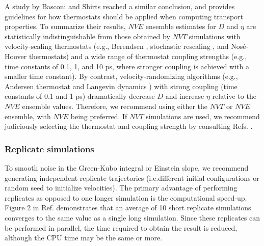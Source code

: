 \documentclass[9pt,bestpractices]{livecoms}
\providecommand{\DIFadd}[1]{{\protect\color{blue}\uwave{#1}}} %
\providecommand{\DIFaddbegin}{} %
\providecommand{\DIFaddend}{} %
\begin{document}
\DIFaddend A study by Basconi and Shirts \cite{Shirts2013} reached a similar conclusion, and provides guidelines for how thermostats should be applied when computing transport properties. To summarize their results, $NVE$ ensemble estimates for $D$ and $\eta$ are statistically indistinguishable from those obtained by $NVT$ simulations with velocity-scaling thermostats (e.g., Berendsen \cite{Berendsen1984}, stochastic rescaling \cite{Bussi2007}, and Nos{\'e}-Hoover \cite{Nose1984} thermostats) and a wide range of thermostat coupling strengths (e.g., time constants of 0.1, 1, and 10 ps, where stronger coupling is achieved with a smaller time constant). By contrast, velocity-randomizing algorithms (e.g., Andersen thermostat \cite{Andersen1980} and Langevin dynamics \cite{Hess2008}) with strong coupling (time constants of 0.1 and 1 ps) dramatically decrease $D$ and increase $\eta$ relative to the $NVE$ ensemble values. Therefore, we recommend using either the $NVT$ or $NVE$ ensemble, with $NVE$ being preferred. If $NVT$ simulations are used, we recommend judiciously selecting the thermostat and coupling strength by consulting Refs. \cite{Fanourgakis2012,Shirts2013}.




\subsubsection{Replicate simulations} \label{sec:General: Replicate simulations}

To smooth noise in the Green-Kubo integral or Einstein slope, we recommend generating independent replicate trajectories (i.e.\DIFaddbegin \DIFadd{, }\DIFaddend different initial configurations or random seed to initialize velocities). The primary advantage of performing replicates as opposed to one longer simulation is the computational speed-up. Figure 2 in Ref. \cite{Payal2012} demonstrates that an average of 10 short replicate simulations converges to the same value as a single long simulation. Since these replicates can be performed in parallel, the time required to obtain the result is reduced, although the CPU time may be the same or more.
\end{document}
